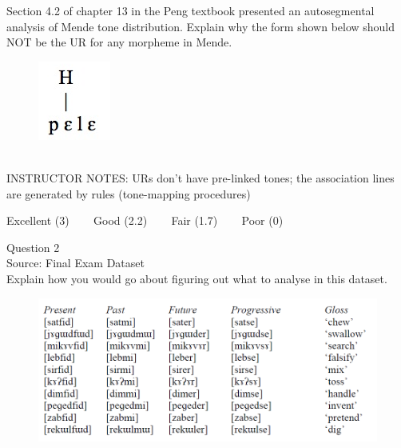 \documentclass[12pt]{article}
\begin{document}
Section 4.2 of chapter 13 in the Peng textbook presented an autosegmental analysis of Mende tone distribution. Explain why the form shown below should NOT be the UR for any morpheme in Mende.\\

\begin{figure}[H]
\includegraphics{../images/mende_house_a.png}
\end{figure}

~\\
INSTRUCTOR NOTES: URs don't have pre-linked tones; the association lines are generated by rules (tone-mapping procedures)


\vfill
Excellent (3) ~~~ Good (2.2) ~~~ Fair (1.7) ~~~ Poor (0)
\newpage

{\large Question 2}\\

Source: Final Exam Dataset\\

Explain how you would go about figuring out what to analyse in this dataset.\\

\begin{figure}[H]
\includegraphics{../images/final_dataset.png}
\end{figure}
\end{document}
